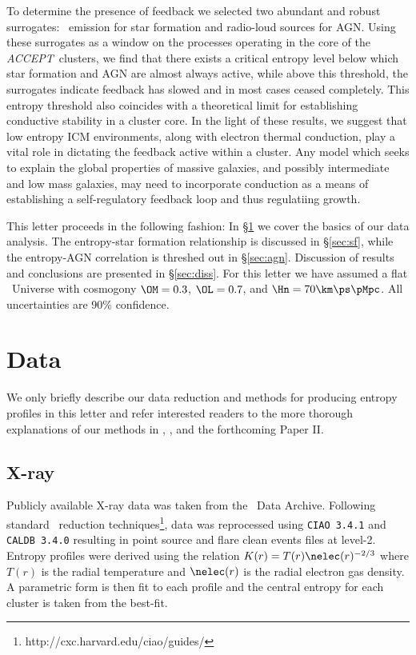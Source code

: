 \documentclass{emulateapj}
\newcommand{\accept}{\textit{ACCEPT}}
\begin{document}
To determine the presence of feedback we selected two abundant and
robust surrogates: \halpha\ emission for star formation and radio-loud
sources for AGN. Using these surrogates as a window on the processes
operating in the core of the \accept\ clusters, we find that there
exists a critical entropy level below which star formation and AGN are
almost always active, while above this threshold, the surrogates
indicate feedback has slowed and in most cases ceased completely. This
entropy threshold also coincides with a theoretical limit for
establishing conductive stability in a cluster core. In the light of
these results, we suggest that low entropy ICM environments, along with
electron thermal conduction, play a vital role in dictating the
feedback active within a cluster. Any model which seeks to explain the
global properties of massive galaxies, and possibly intermediate and
low mass galaxies, may need to incorporate conduction as a means of
establishing a self-regulatory feedback loop and thus regulatiing
growth.

This letter proceeds in the following fashion:
In \S\ref{sec:data} we cover the basics of our data analysis. The
entropy-star formation relationship is discussed in \S\ref{sec:sf},
while the entropy-AGN correlation is threshed out in
\S\ref{sec:agn}. Discussion of results and conclusions are presented
in \S\ref{sec:diss}.  For this letter we have assumed a flat \LCDM\
Universe with cosmogony $\OM=0.3$, $\OL=0.7$, and
$\Hn=70\km\ps\pMpc$. All uncertainties are 90\% confidence.

\section{Data}
\label{sec:data}

We only briefly describe our data reduction and methods for producing
entropy profiles in this letter and refer interested readers to the
more thorough explanations of our methods in
\cite{2006ApJ...643..730D}, \cite{xrayband}, and the forthcoming
Paper II.

\subsection{X-ray}
\label{sec:xray}

Publicly available X-ray data was taken from the \Chandra\ Data
Archive. Following standard \Ciao\ reduction
techniques\footnote{http://cxc.harvard.edu/ciao/guides/}, data was
reprocessed using {\tt CIAO 3.4.1} and {\tt CALDB 3.4.0} resulting in
point source and flare clean events files at level-2. Entropy profiles
were derived using the relation $K(r) = T(r) \nelec(r)^{-2/3}$ where
$T(r)$ is the radial temperature and $\nelec(r)$ is the radial
electron gas density. A parametric form is then fit to each profile
and the central entropy for each cluster is taken from the best-fit.
\end{document}

